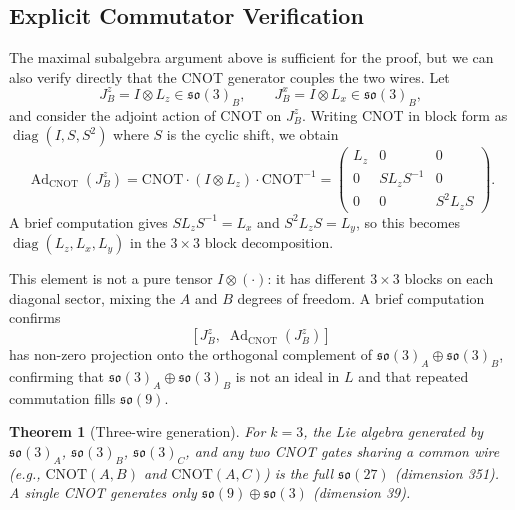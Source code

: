 \documentclass[12pt,a4paper]{article}
\newtheorem{theorem}{Theorem}
\newcommand{\Ad}{\operatorname{Ad}}
\begin{document}
\subsection{Explicit Commutator Verification}
\label{sec:explicitcomm}

The maximal subalgebra argument above is sufficient for the proof, but
we can also verify directly that the CNOT generator couples the two wires.
Let
\[
J_B^z = I \otimes L_z \in \mathfrak{so}(3)_B,\qquad
J_B^x = I \otimes L_x \in \mathfrak{so}(3)_B,
\]
and consider the adjoint action of CNOT on $J_B^z$. Writing CNOT in
block form as $\operatorname{diag}(I, S, S^2)$ where $S$ is the cyclic
shift, we obtain
\[
\Ad_{\text{CNOT}}(J_B^z) = \text{CNOT} \cdot (I \otimes L_z) \cdot
\text{CNOT}^{-1}
= \begin{pmatrix} L_z & 0 & 0 \\ 0 & S L_z S^{-1} & 0 \\
0 & 0 & S^2 L_z S \end{pmatrix}.
\]
A brief computation gives $S L_z S^{-1} = L_x$ and
$S^2 L_z S = L_y$, so this becomes
$\operatorname{diag}(L_z, L_x, L_y)$ in the $3 \times 3$ block
decomposition.

This element is not a pure tensor $I \otimes (\cdot)$: it has different
$3\times 3$ blocks on each diagonal sector, mixing the $A$ and $B$
degrees of freedom. A brief computation confirms
\[
[J_B^z,\; \Ad_{\text{CNOT}}(J_B^z)]
\]
has non-zero projection onto the orthogonal complement of
$\mathfrak{so}(3)_A \oplus \mathfrak{so}(3)_B$, confirming that
$\mathfrak{so}(3)_A \oplus \mathfrak{so}(3)_B$ is not an ideal in $L$
and that repeated commutation fills $\mathfrak{so}(9)$.

\begin{theorem}[Three-wire generation]
\label{thm:3wire}
For $k=3$, the Lie algebra generated by $\mathfrak{so}(3)_A$,
$\mathfrak{so}(3)_B$, $\mathfrak{so}(3)_C$, and any two CNOT gates
sharing a common wire (e.g., $\text{CNOT}(A,B)$ and $\text{CNOT}(A,C)$)
is the full $\mathfrak{so}(27)$ (dimension 351). A single CNOT generates
only $\mathfrak{so}(9) \oplus \mathfrak{so}(3)$ (dimension 39).
\end{theorem}
\end{document}
